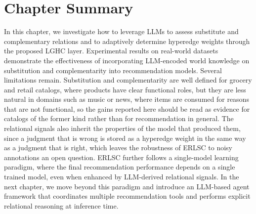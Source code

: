 \section{Chapter Summary}

In this chapter, we investigate how to leverage LLMs to assess substitute and complementary relations and to adaptively determine hyperedge weights through the proposed LGHC layer. Experimental results on real-world datasets demonstrate the effectiveness of incorporating LLM-encoded world knowledge on substitution and complementarity into recommendation models.
Several limitations remain. Substitution and complementarity are well defined for grocery and retail catalogs, where products have clear functional roles, but they are less natural in domains such as music or news, where items are consumed for reasons that are not functional, so the gains reported here should be read as evidence for catalogs of the former kind rather than for recommendation in general. The relational signals also inherit the properties of the model that produced them, since a judgment that is wrong is stored as a hyperedge weight in the same way as a judgment that is right, which leaves the robustness of ERLSC to noisy annotations an open question.
ERLSC further follows a single-model learning paradigm, where the final recommendation performance depends on a single trained model, even when enhanced by LLM-derived relational signals. In the next chapter, we move beyond this paradigm and introduce an LLM-based agent framework that coordinates multiple recommendation tools and performs explicit relational reasoning at inference time.
